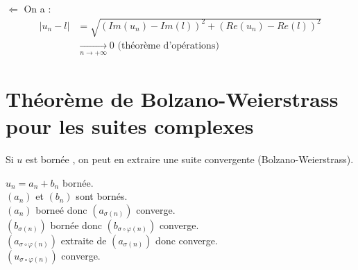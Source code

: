 \documentclass[../main.tex]{subfiles}
\begin{document}
$\boxed{\Leftarrow}$
On a : 
\begin{align*}
    |u_n - l| &= \sqrt{(Im(u_n) - Im(l))^2 + (Re(u_n) - Re(l))^2} \\
    &\underset{n \to +\infty}{\longrightarrow} 0 \text{ (théorème d'opérations)}
\end{align*}

\section{Théorème de Bolzano-Weierstrass pour les suites complexes}
\begin{tcolorbox}[title=Remarque 14.73, title filled=false, colframe=lightblue, colback=lightblue!10!white]
    Si $u$ est bornée , on peut en extraire une suite convergente (Bolzano-Weierstrass). 
\end{tcolorbox}

$u_n = a_n + b_n$ bornée. \\
$(a_n)$ et $(b_n)$ sont bornés. \\
$(a_n)$ borneé donc $(a_{\sigma(n)})$ converge. \\
$(b_{\sigma(n)})$ bornée donc $(b_{\sigma \circ \varphi(n)})$ converge. \\
$(a_{\sigma \circ \varphi(n)})$ extraite de $(a_{\sigma (n)})$ donc converge. \\
$(u_{\sigma \circ \varphi(n)})$ converge. 
\end{document}
